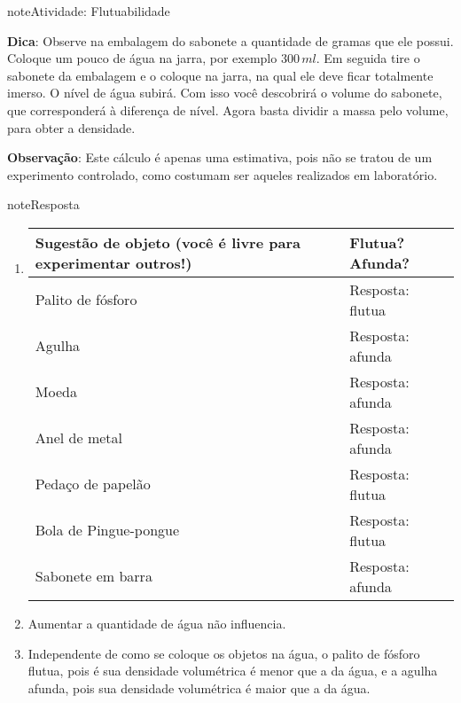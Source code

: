 \begin{sphinxadmonition}{note}{Atividade: Flutuabilidade}
\begin{enumerate}
\textbf{Dica}: Observe na embalagem do sabonete a quantidade de gramas que ele possui. Coloque um pouco de água na jarra, por exemplo \(300\, ml\). Em seguida tire o sabonete da embalagem e o coloque na jarra, na qual ele deve ficar totalmente imerso. O nível de água subirá. Com isso você descobrirá o volume do sabonete, que corresponderá à diferença de nível. Agora basta dividir a massa pelo volume, para obter a densidade.

\textbf{Observação}: Este cálculo é apenas uma estimativa, pois não se tratou de um experimento controlado, como costumam ser aqueles realizados em laboratório.

\end{enumerate}
\end{sphinxadmonition}

\begin{sphinxadmonition}{note}{Resposta}
\begin{enumerate}
\item {} 

\begin{savenotes}\sphinxattablestart
\centering
\begin{tabulary}{\linewidth}[t]{|T|T|}
\hline

Sugestão de objeto (você é
livre para experimentar outros!)
&
Flutua? Afunda?
\\
\hline
Palito de fósforo
&
Resposta: flutua
\\
\hline
Agulha
&
Resposta: afunda
\\
\hline
Moeda
&
Resposta: afunda
\\
\hline
Anel de metal
&
Resposta: afunda
\\
\hline
Pedaço de papelão
&
Resposta: flutua
\\
\hline
Bola
de Pingue-pongue
&
Resposta: flutua
\\
\hline
Sabonete
em barra
&
Resposta: afunda
\\
\hline
\end{tabulary}
\par
\sphinxattableend\end{savenotes}

\item {} 
Aumentar a quantidade  de água não influencia.

\item {} 
Independente de como se coloque os objetos na água, o palito de fósforo flutua, pois é sua densidade volumétrica é menor que a da água, e a agulha afunda, pois sua densidade volumétrica é maior que a da água.


\end{enumerate}
\end{sphinxadmonition}
